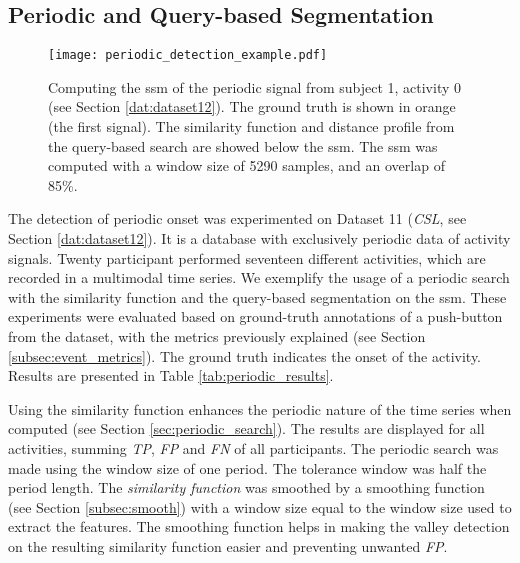 \subsection{Periodic and Query-based Segmentation}


\begin{figure}
\centering
\texttt{[image: periodic\_detection\_example.pdf]}
\caption{Computing the \gls{ssm} of the periodic signal from subject 1, activity 0 (see Section \ref{dat:dataset12}). The ground truth is shown in orange (the first signal). The similarity function and distance profile from the query-based search are showed below the \gls{ssm}. The \gls{ssm} was computed with a window size of 5290 samples, and an overlap of 85\%.}
\label{fig:periodic_detection}
\end{figure}


The detection of periodic onset was experimented on Dataset 11 (\textit{CSL}, see Section \ref{dat:dataset12}). It is a database with exclusively periodic data of activity signals. Twenty participant performed seventeen different activities, which are recorded in a multimodal time series. We exemplify the usage of a periodic search with the similarity function and the query-based segmentation on the \gls{ssm}. These experiments were evaluated based on ground-truth annotations of a push-button from the dataset, with the metrics previously explained (see Section \ref{subsec:event_metrics}). The ground truth indicates the onset of the activity. Results are presented in Table \ref{tab:periodic_results}.

Using the similarity function enhances the periodic nature of the time series when computed (see Section \ref{sec:periodic_search}). The results are displayed for all activities, summing \textit{TP}, \textit{FP} and \textit{FN} of all participants. The periodic search was made using the window size of one period. The tolerance window was half the period length. The \textit{similarity function} was smoothed by a smoothing function (see Section \ref{subsec:smooth}) with a window size equal to the window size used to extract the features. The smoothing function helps in making the valley detection on the resulting similarity function easier and preventing unwanted \textit{FP}.

